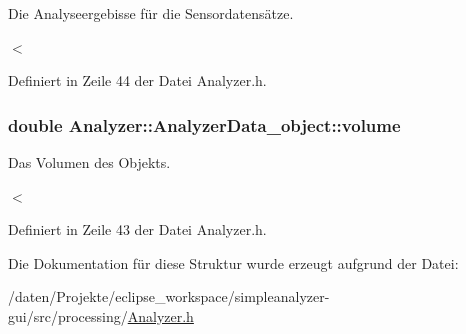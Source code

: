 Die Analyseergebisse für die Sensordatensätze. 

$<$ 

Definiert in Zeile 44 der Datei Analyzer.\-h.

\hypertarget{structAnalyzer_1_1AnalyzerData__object_a78ddeb311ff702e110fc1d483d826920}{
\subsubsection[{volume}]{\setlength{\rightskip}{0pt plus 5cm}double Analyzer\-::\-Analyzer\-Data\-\_\-object\-::volume}}\label{structAnalyzer_1_1AnalyzerData__object_a78ddeb311ff702e110fc1d483d826920}


Das Volumen des Objekts. 

$<$ 

Definiert in Zeile 43 der Datei Analyzer.\-h.



Die Dokumentation für diese Struktur wurde erzeugt aufgrund der Datei\-:\begin{DoxyCompactItemize}
\item 
/daten/\-Projekte/eclipse\-\_\-workspace/simpleanalyzer-\/gui/src/processing/\hyperlink{Analyzer_8h}{Analyzer.\-h}\end{DoxyCompactItemize}
